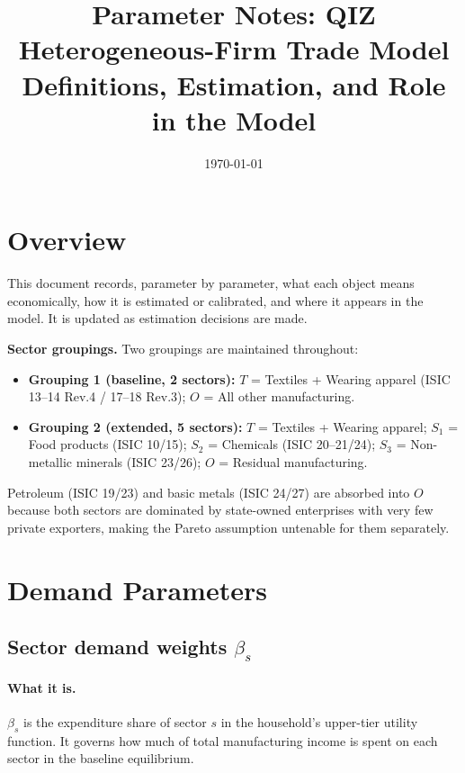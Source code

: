 \documentclass[12pt]{article}
\title{Parameter Notes: QIZ Heterogeneous-Firm Trade Model\\
\large Definitions, Estimation, and Role in the Model}
\author{}
\date{\today}
\begin{document}
\maketitle
\tableofcontents
\newpage

\section{Overview}

This document records, parameter by parameter, what each object means
economically, how it is estimated or calibrated, and where it appears in
the model. It is updated as estimation decisions are made.

\medskip
\noindent\textbf{Sector groupings.} Two groupings are maintained throughout:
\begin{itemize}
  \item \textbf{Grouping 1 (baseline, 2 sectors):}
        $T$ = Textiles + Wearing apparel (ISIC 13--14 Rev.4 / 17--18 Rev.3);
        $O$ = All other manufacturing.
  \item \textbf{Grouping 2 (extended, 5 sectors):}
        $T$ = Textiles + Wearing apparel;
        $S_1$ = Food products (ISIC 10/15);
        $S_2$ = Chemicals (ISIC 20--21/24);
        $S_3$ = Non-metallic minerals (ISIC 23/26);
        $O$ = Residual manufacturing.
\end{itemize}
Petroleum (ISIC 19/23) and basic metals (ISIC 24/27) are absorbed into $O$
because both sectors are dominated by state-owned enterprises with very few
private exporters, making the Pareto assumption untenable for them separately.

\section{Demand Parameters}

\subsection{Sector demand weights $\beta_s$}

\paragraph{What it is.}
$\beta_s$ is the expenditure share of sector $s$ in the household's upper-tier
utility function. It governs how much of total manufacturing income is spent on
each sector in the baseline equilibrium.
\end{document}
